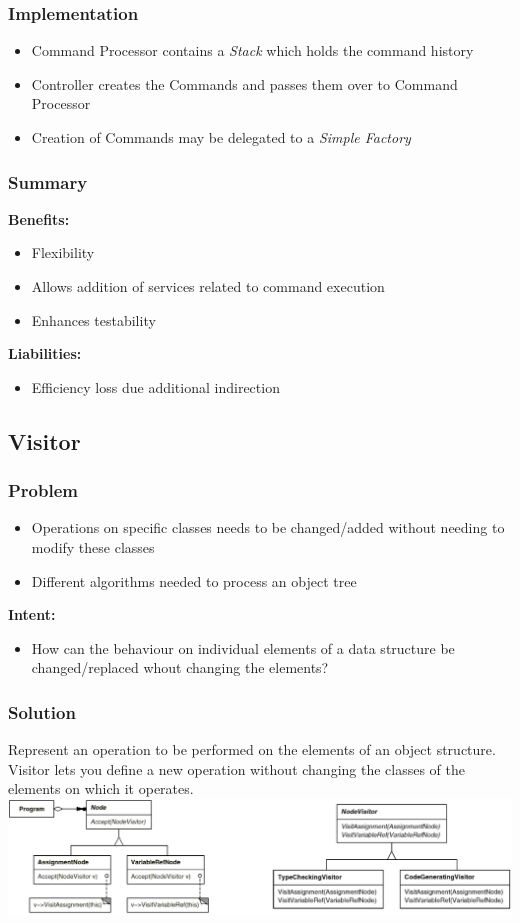 \subsubsection{Implementation}
\begin{itemize}
    \item Command Processor contains a \textit{Stack} which holds the command history
    \item Controller creates the Commands and passes them over to Command Processor
    \item Creation of Commands may be delegated to a \textit{Simple Factory}
\end{itemize}
\subsubsection{Summary}
\textbf{Benefits:}
\begin{itemize}
    \item Flexibility
    \item Allows addition of services related to command execution
    \item Enhances testability
\end{itemize}
\textbf{Liabilities:}
\begin{itemize}
    \item Efficiency loss due additional indirection
\end{itemize}

\subsection{Visitor}
\subsubsection{Problem}
\begin{itemize}
    \item Operations on specific classes needs to be changed/added without needing to modify these classes
    \item Different algorithms needed to process an object tree
\end{itemize}
\textbf{Intent:}
\begin{itemize}
    \item How can the behaviour on individual elements of a data structure be changed/replaced whout changing the elements?
\end{itemize}
\subsubsection{Solution}
Represent an operation to be performed on the elements of an object structure. Visitor lets you define a new operation without changing the classes of the elements on which it operates.\\ 
\includegraphics[width=\linewidth]{./img/visitor.png}
